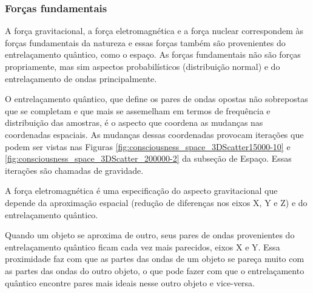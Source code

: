 \subsubsection{Forças fundamentais}
A força gravitacional, a força eletromagnética e a força nuclear correspondem às forças fundamentais da natureza e essas forças também são provenientes do entrelaçamento quântico, como o espaço. As forças fundamentais não são forças propriamente, mas sim aspectos probabilísticos (distribuição normal) e do entrelaçamento de ondas principalmente.

O entrelaçamento quântico, que define os pares de ondas opostas não sobrepostas que se completam e que mais se assemelham em termos de frequência e distribuição das amostras, é o aspecto que coordena as mudanças nas coordenadas espaciais. As mudanças dessas coordenadas provocam iterações que podem ser vistas nas Figuras \ref{fig:consciousness_space_3DScatter15000-10} e \ref{fig:consciousness_space_3DScatter_200000-2} da subseção de Espaço. Essas iterações são chamadas de gravidade.

A força eletromagnética é uma especificação do aspecto gravitacional que depende da aproximação espacial (redução de diferenças nos eixos X, Y e Z) e do entrelaçamento quântico.

Quando um objeto se aproxima de outro, seus pares de ondas provenientes do entrelaçamento quântico ficam cada vez mais parecidos, eixos X e Y. Essa proximidade faz com que as partes das ondas de um objeto se pareça muito com as partes das ondas do outro objeto, o que pode fazer com que o entrelaçamento quântico encontre pares mais ideais nesse outro objeto e vice-versa.  

